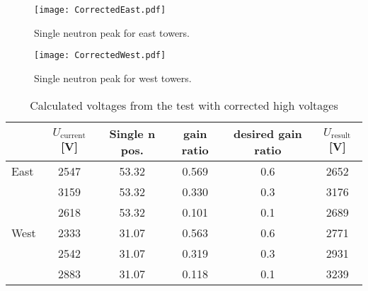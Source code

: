 \documentclass[a4paper,10pt]{article}
\begin{document}
\begin{figure}[!htb]
\begin{center}
\texttt{[image: CorrectedEast.pdf]}
\end{center}
\caption{Single neutron peak for east towers.}
\end{figure}

\begin{figure}[!htb]
\begin{center}
\texttt{[image: CorrectedWest.pdf]}
\end{center}
\caption{Single neutron peak for west towers.}
\end{figure}

\begin{table}[!htb] 
\caption{Calculated voltages from the test with corrected high voltages}
\label{corected}
\begin{center}
\begin{tabular}{lccccc}
 \toprule
 &$U_\text{current}$[V]&Single n pos.&gain ratio&desired gain ratio&$U_\text{result}$[V]\\
\midrule
 East&2547&53.32&0.569&0.6&2652\\
     &3159&53.32&0.330&0.3&3176\\
     &2618&53.32&0.101&0.1&2689\\
 \midrule
West&2333&31.07&0.563&0.6&2771\\
    &2542&31.07&0.319&0.3&2931\\
    &2883&31.07&0.118&0.1&3239\\
 \bottomrule
\end{tabular}
\end{center}
\end{table}
\end{document}
